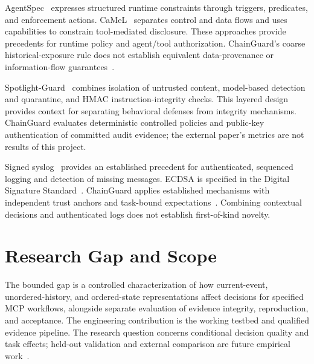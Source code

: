 \documentclass[conference]{IEEEtran}
\begin{document}
AgentSpec~\cite{agentspec} expresses structured runtime constraints through triggers, predicates, and enforcement actions. CaMeL~\cite{camel} separates control and data flows and uses capabilities to constrain tool-mediated disclosure. These approaches provide precedents for runtime policy and agent/tool authorization. ChainGuard's coarse historical-exposure rule does not establish equivalent data-provenance or information-flow guarantees~\cite{cgthreat}.

Spotlight-Guard~\cite{demirol2026} combines isolation of untrusted content, model-based detection and quarantine, and HMAC instruction-integrity checks. This layered design provides context for separating behavioral defenses from integrity mechanisms. ChainGuard evaluates deterministic controlled policies and public-key authentication of committed audit evidence; the external paper's metrics are not results of this project.

Signed syslog~\cite{syslog} provides an established precedent for authenticated, sequenced logging and detection of missing messages. ECDSA is specified in the Digital Signature Standard~\cite{dss}. ChainGuard applies established mechanisms with independent trust anchors and task-bound expectations~\cite{cglock}. Combining contextual decisions and authenticated logs does not establish first-of-kind novelty.


\section{Research Gap and Scope}
The bounded gap is a controlled characterization of how current-event, unordered-history, and ordered-state representations affect decisions for specified MCP workflows, alongside separate evaluation of evidence integrity, reproduction, and acceptance. The engineering contribution is the working testbed and qualified evidence pipeline. The research question concerns conditional decision quality and task effects; held-out validation and external comparison are future empirical work~\cite{cgprotocol,cgresults}.
\end{document}
